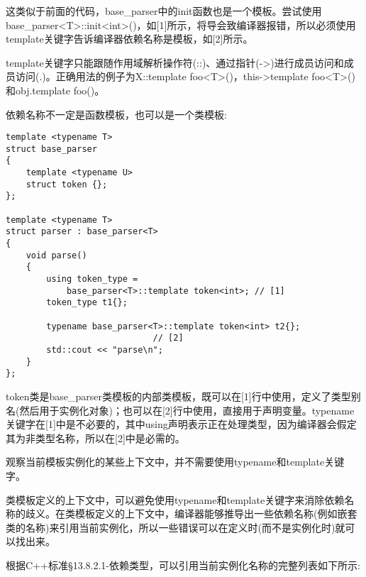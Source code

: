 这类似于前面的代码，base\_parser中的init函数也是一个模板。尝试使用base\_parser<T>::init<int>()，如[1]所示，将导会致编译器报错，所以必须使用template关键字告诉编译器依赖名称是模板，如[2]所示。

template关键字只能跟随作用域解析操作符(::)、通过指针(->)进行成员访问和成员访问(.)。正确用法的例子为X::template foo<T>()，this->template foo<T>()和obj.template foo()。

依赖名称不一定是函数模板，也可以是一个类模板:

\begin{lstlisting}[style=styleCXX]
template <typename T>
struct base_parser
{
	template <typename U>
	struct token {};
};

template <typename T>
struct parser : base_parser<T>
{
	void parse()
	{
		using token_type =
			base_parser<T>::template token<int>; // [1]
		token_type t1{};

		typename base_parser<T>::template token<int> t2{};
		                     // [2]
		std::cout << "parse\n";
	}
};
\end{lstlisting}

token类是base\_parser类模板的内部类模板，既可以在[1]行中使用，定义了类型别名(然后用于实例化对象)；也可以在[2]行中使用，直接用于声明变量。typename关键字在[1]中是不必要的，其中using声明表示正在处理类型，因为编译器会假定其为非类型名称，所以在[2]中是必需的。

观察当前模板实例化的某些上下文中，并不需要使用typename和template关键字。


类模板定义的上下文中，可以避免使用typename和template关键字来消除依赖名称的歧义。在类模板定义的上下文中，编译器能够推导出一些依赖名称(例如嵌套类的名称)来引用当前实例化，所以一些错误可以在定义时(而不是实例化时)就可以找出来。

根据C++标准§13.8.2.1-依赖类型，可以引用当前实例化名称的完整列表如下所示:

